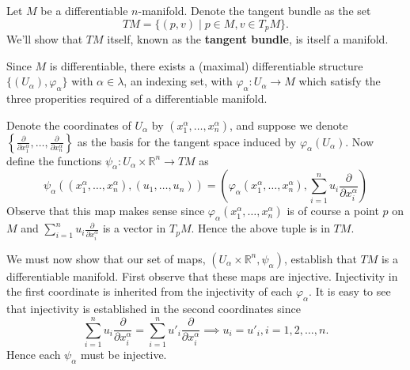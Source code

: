 \documentclass[12pt,letterpaper,boxed]{math_hw_pset}
\newcommand{\rr}{\mathbb{R}}
\renewcommand{\phi}{\varphi}
\begin{document}
\begin{solution}
    Let $M$ be a differentiable $n$-manifold. Denote the tangent bundle 
    as the set 
    \[
        TM = \{(p, v) \mid p \in M, v \in T_pM \}.
    \]
    We'll show that $TM$ itself, known as the \textbf{tangent bundle}, is  
    itself a manifold.
    
    Since $M$ is differentiable, there exists a (maximal)
    differentiable structure $\{(U_\alpha), \phi_\alpha\}$ with $\alpha \in \lambda$, an indexing set, 
    with 
    $\phi_\alpha: U_\alpha \to M$ which satisfy the three properities required
    of a differentiable manifold. 

    Denote the coordinates of $U_\alpha$ by $(x^\alpha_1, \dots, x^\alpha_n)$, 
    and suppose we denote $\displaystyle \left\{ \frac{\partial}{\partial x_1^\alpha}, \dots, \frac{\partial}{\partial x_n^\alpha} \right\}$
    as the basis for the tangent space induced by $\phi_\alpha(U_\alpha)$.  
    Now define the functions $\psi_\alpha: U_\alpha\times\rr^n \to TM$ as 
    \[
        \psi_\alpha((x_1^\alpha, \dots, x_n^\alpha), (u_1, \dots, u_n)) 
        = \left(\phi_\alpha(x_1^\alpha,  \dots, x_n^{\alpha}), 
        \sum_{i=1}^{n}u_i\frac{\partial}{\partial x_i^\alpha}\right)
    \]
    Observe that this map makes sense since $\phi_\alpha(x_1^\alpha, \dots, x_n^\alpha)$ 
    is of course a point $p$ on $M$ and $\displaystyle  \sum_{i=1}^{n}u_i\frac{\partial}{\partial x_i^\alpha}$ 
    is a vector in $T_pM$. Hence the above tuple is in $TM$. 

    We must now show that our set of maps, $(U_\alpha\times\rr^n, \psi_\alpha)$,  
    establish that $TM$ is a differentiable manifold. First observe that these maps 
    are injective. Injectivity in the first coordinate is inherited from the injectivity of 
    each $\phi_\alpha$.
    It is easy to see that injectivity is established in the second coordinates 
    since 
    \[
        \sum_{i=1}^{n}u_i\frac{\partial}{\partial x_i^\alpha} = \sum_{i=1}^{n}u'_i\frac{\partial}{\partial x_i^\alpha} 
        \implies u_i = u'_i, i = 1,2, \dots, n.
    \]
    Hence each $\psi_\alpha$ must be injective. 


\end{solution}
\end{document}
